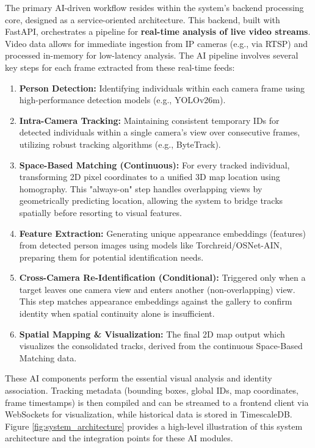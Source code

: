 The primary AI-driven workflow resides within the system's backend processing core, designed as a service-oriented architecture. This backend, built with FastAPI, orchestrates a pipeline for \textbf{real-time analysis of live video streams}. Video data allows for immediate ingestion from IP cameras (e.g., via RTSP) and processed in-memory for low-latency analysis. The AI pipeline involves several key steps for each frame extracted from these real-time feeds:
\begin{enumerate}
    \item \textbf{Person Detection:} Identifying individuals within each camera frame using high-performance detection models (e.g., YOLOv26m).
    \item \textbf{Intra-Camera Tracking:} Maintaining consistent temporary IDs for detected individuals within a single camera's view over consecutive frames, utilizing robust tracking algorithms (e.g., ByteTrack).
    \item \textbf{Space-Based Matching (Continuous):} For every tracked individual, transforming 2D pixel coordinates to a unified 3D map location using homography. This "always-on" step handles overlapping views by geometrically predicting location, allowing the system to bridge tracks spatially before resorting to visual features.
    \item \textbf{Feature Extraction:} Generating unique appearance embeddings (features) from detected person images using models like Torchreid/OSNet-AIN, preparing them for potential identification needs.
    \item \textbf{Cross-Camera Re-Identification (Conditional):} Triggered only when a target leaves one camera view and enters another (non-overlapping) view. This step matches appearance embeddings against the gallery to confirm identity when spatial continuity alone is insufficient.
    \item \textbf{Spatial Mapping \& Visualization:} The final 2D map output which visualizes the consolidated tracks, derived from the continuous Space-Based Matching data.
\end{enumerate}
These AI components perform the essential visual analysis and identity association. Tracking metadata (bounding boxes, global IDs, map coordinates, frame timestamps) is then compiled and can be streamed to a frontend client via WebSockets for visualization, while historical data is stored in TimescaleDB. Figure \ref{fig:system_architecture} provides a high-level illustration of this system architecture and the integration points for these AI modules.


